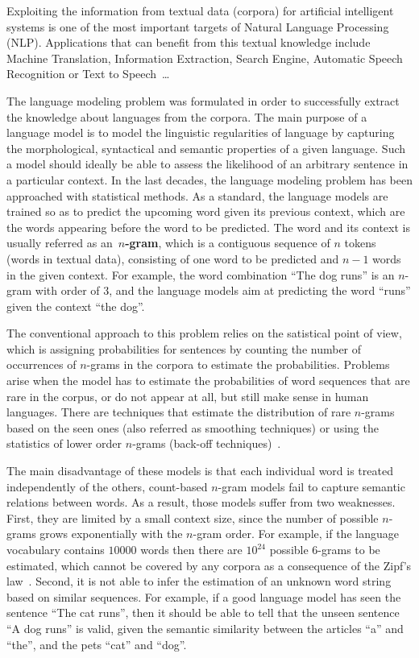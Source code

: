 Exploiting the information from textual data (corpora) for artificial intelligent systems is one
of the most important targets of Natural Language Processing (NLP). Applications that can benefit 
from this textual knowledge include Machine Translation, Information Extraction, Search Engine, Automatic 
Speech Recognition or Text to Speech~\dots

The language modeling problem was formulated in order to successfully extract the knowledge about languages from the corpora. The main purpose of a language model is to model the linguistic regularities of language by capturing the morphological, syntactical and semantic properties of a given language. Such a model should ideally be able to assess the likelihood of an arbitrary sentence in a particular context. In the last decades, the language modeling problem has been approached with statistical methods. As a standard, the language models are trained so as to predict the upcoming word given its previous context, which are the words appearing before the word to be predicted. The word and its context is usually referred as an~\textbf{$n$-gram}, which is a contiguous sequence of $n$ tokens (words in textual data), consisting of one word to be predicted and $n-1$ words in the given context. For example, the word combination ``The dog runs'' is an $n$-gram with order of $3$, and the language models aim at predicting the word ``runs'' given the context ``the dog''. 

The conventional approach to this problem relies on the satistical point of view, which is assigning probabilities for sentences by counting the number of occurrences of $n$-grams in the corpora to estimate the probabilities. Problems arise when  the model has to estimate the probabilities of word sequences that are rare in the corpus, or do not appear at all, but still make sense in human languages. There are techniques that estimate the distribution of rare $n$-grams based on the seen ones (also referred as smoothing techniques) or using the statistics of lower order $n$-grams (back-off techniques)~\cite{kneser1995improved,chen1999empirical,heafield2011kenlm,federico2008irstlm,ney1994structuring,witten1991zero}. 

 The main disadvantage of these models is that each individual word is treated independently of the others, count-based $n$-gram models fail to capture semantic relations between words. As a result, those models suffer from two weaknesses. First, they are limited by a small context size, since the number of possible $n$-grams grows exponentially with the $n$-gram order. For example, if the language vocabulary 
 contains $10000$ words then there are $10^{24}$ possible 6-grams to be estimated, which cannot be covered by any corpora as a consequence of the Zipf's law~\cite{kingsley1932selective}. Second, it is not able to infer the estimation of an unknown word string based on similar sequences. For example, if a good language model has seen the sentence ``The cat runs'', then it should be able to tell that the unseen sentence ``A dog runs'' is valid, given the semantic similarity between the articles ``a'' and ``the'', and the pets ``cat'' and ``dog''. 
 
